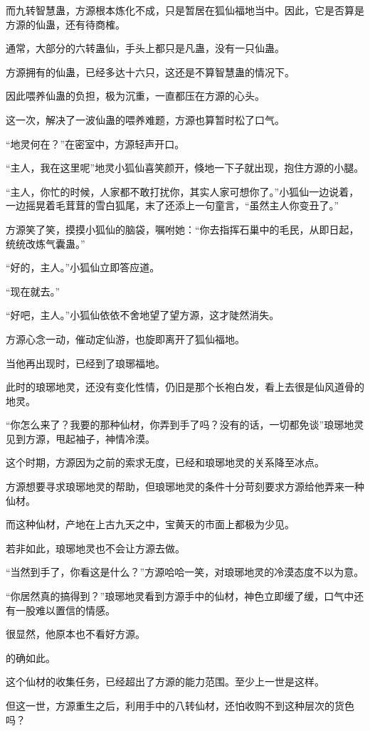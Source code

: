 \begin{this_body}
而九转智慧蛊，方源根本炼化不成，只是暂居在狐仙福地当中。因此，它是否算是方源的仙蛊，还有待商榷。

通常，大部分的六转蛊仙，手头上都只是凡蛊，没有一只仙蛊。

方源拥有的仙蛊，已经多达十六只，这还是不算智慧蛊的情况下。

因此喂养仙蛊的负担，极为沉重，一直都压在方源的心头。

这一次，解决了一波仙蛊的喂养难题，方源也算暂时松了口气。

“地灵何在？”在密室中，方源轻声开口。

“主人，我在这里呢”地灵小狐仙喜笑颜开，倏地一下子就出现，抱住方源的小腿。

“主人，你忙的时候，人家都不敢打扰你，其实人家可想你了。”小狐仙一边说着，一边摇晃着毛茸茸的雪白狐尾，末了还添上一句童言，“虽然主人你变丑了。”

方源笑了笑，摸摸小狐仙的脑袋，嘱咐她：“你去指挥石巢中的毛民，从即日起，统统改炼气囊蛊。”

“好的，主人。”小狐仙立即答应道。

“现在就去。”

“好吧，主人。”小狐仙依依不舍地望了望方源，这才陡然消失。

方源心念一动，催动定仙游，也旋即离开了狐仙福地。

当他再出现时，已经到了琅琊福地。

此时的琅琊地灵，还没有变化性情，仍旧是那个长袍白发，看上去很是仙风道骨的地灵。

“你怎么来了？我要的那种仙材，你弄到手了吗？没有的话，一切都免谈”琅琊地灵见到方源，甩起袖子，神情冷漠。

这个时期，方源因为之前的索求无度，已经和琅琊地灵的关系降至冰点。

方源想要寻求琅琊地灵的帮助，但琅琊地灵的条件十分苛刻要求方源给他弄来一种仙材。

而这种仙材，产地在上古九天之中，宝黄天的市面上都极为少见。

若非如此，琅琊地灵也不会让方源去做。

“当然到手了，你看这是什么？”方源哈哈一笑，对琅琊地灵的冷漠态度不以为意。

“你居然真的搞得到？”琅琊地灵看到方源手中的仙材，神色立即缓了缓，口气中还有一股难以置信的情感。

很显然，他原本也不看好方源。

的确如此。

这个仙材的收集任务，已经超出了方源的能力范围。至少上一世是这样。

但这一世，方源重生之后，利用手中的八转仙材，还怕收购不到这种层次的货色吗？


\end{this_body}
